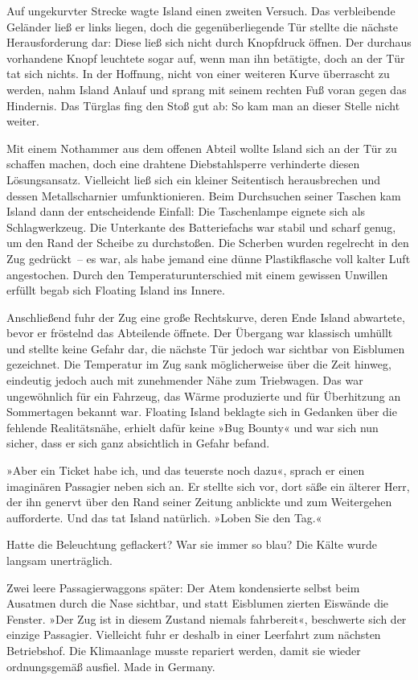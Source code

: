 Auf ungekurvter Strecke wagte Island einen zweiten Versuch. Das verbleibende Geländer ließ er links liegen, doch die gegenüberliegende Tür stellte die nächste Herausforderung dar: Diese ließ sich nicht durch Knopfdruck öffnen. Der durchaus vorhandene Knopf leuchtete sogar auf, wenn man ihn betätigte, doch an der Tür tat sich nichts. In der Hoffnung, nicht von einer weiteren Kurve überrascht zu werden, nahm Island Anlauf und sprang mit seinem rechten Fuß voran gegen das Hindernis. Das Türglas fing den Stoß gut ab: So kam man an dieser Stelle nicht weiter.

Mit einem Nothammer aus dem offenen Abteil wollte Island sich an der Tür zu schaffen machen, doch eine drahtene Diebstahlsperre verhinderte diesen Lösungsansatz. Vielleicht ließ sich ein kleiner Seitentisch herausbrechen und dessen Metallscharnier umfunktionieren. Beim Durchsuchen seiner Taschen kam Island dann der entscheidende Einfall: Die Taschenlampe eignete sich als Schlagwerkzeug. Die Unterkante des Batteriefachs war stabil und scharf genug, um den Rand der Scheibe zu durchstoßen. Die Scherben wurden regelrecht in den Zug gedrückt~– es war, als habe jemand eine dünne Plastikflasche voll kalter Luft angestochen. Durch den Temperaturunterschied mit einem gewissen Unwillen erfüllt begab sich Floating Island ins Innere.

Anschließend fuhr der Zug eine große Rechtskurve, deren Ende Island abwartete, bevor er fröstelnd das Abteilende öffnete. Der Übergang war klassisch umhüllt und stellte keine Gefahr dar, die nächste Tür jedoch war sichtbar von Eisblumen gezeichnet. Die Temperatur im Zug sank möglicherweise über die Zeit hinweg, eindeutig jedoch auch mit zunehmender Nähe zum Triebwagen. Das war ungewöhnlich für ein Fahrzeug, das Wärme produzierte und für Überhitzung an Sommertagen bekannt war. Floating Island beklagte sich in Gedanken über die fehlende Realitätsnähe, erhielt dafür keine »Bug Bounty« und war sich nun sicher, dass er sich ganz absichtlich in Gefahr befand.

»Aber ein Ticket habe ich, und das teuerste noch dazu«, sprach er einen imaginären Passagier neben sich an. Er stellte sich vor, dort säße ein älterer Herr, der ihn genervt über den Rand seiner Zeitung anblickte und zum Weitergehen aufforderte. Und das tat Island natürlich. »Loben Sie den Tag.«

Hatte die Beleuchtung geflackert? War sie immer so blau? Die Kälte wurde langsam unerträglich.

Zwei leere Passagierwaggons später: Der Atem kondensierte selbst beim Ausatmen durch die Nase sichtbar, und statt Eisblumen zierten Eiswände die Fenster. »Der Zug ist in diesem Zustand niemals fahrbereit«, beschwerte sich der einzige Passagier. Vielleicht fuhr er deshalb in einer Leerfahrt zum nächsten Betriebshof. Die Klimaanlage musste repariert werden, damit sie wieder ordnungsgemäß ausfiel. Made in Germany.

